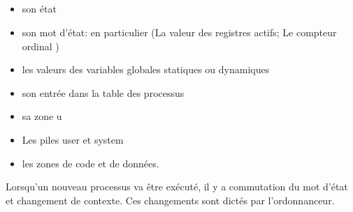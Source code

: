 \subsection{\subsectitle}
\begin{frame}{\sectitle}
\begin{block}{\subsectitle}
\begin{itemize}
\item son état
\item son mot d'état: en particulier
          (La valeur des registres actifs; Le compteur ordinal )
\item les valeurs des variables globales statiques ou dynamiques
\item son entrée dans la table des processus
\item sa zone u
\item Les piles user et system
\item les zones de code et de données. 
\end{itemize}
\end{block}

\begin{block}{\subsectitle}
Lorsqu'un nouveau processus va être exécuté, il y a commutation du mot d'état et changement de contexte.
Ces changements sont dictés par l'ordonnanceur.
\end{block}
\end{frame}

